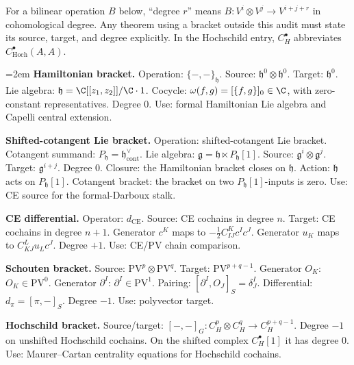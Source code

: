 \documentclass[11pt]{memoir}
\begin{document}
\noindent
For a bilinear operation \(B\) below, ``degree \(r\)''
means \(B\colon V^i\otimes V^j\to V^{i+j+r}\) in cohomological degree.
Any theorem using a bracket outside this audit must state its source,
target, and degree explicitly.  In the Hochschild entry,
\(C_H^\bullet\) abbreviates \(C^\bullet_{\mathrm{Hoch}}(A,A)\).
\begingroup
\footnotesize
\raggedright
\emergencystretch=2em
\noindent\textbf{Hamiltonian bracket.}
Operation: \(\{-,-\}_{\mathfrak h}\).  Source:
\(\mathfrak h^0\otimes\mathfrak h^0\).  Target: \(\mathfrak h^0\).
Lie algebra: \(\mathfrak h=\C[[z_1,z_2]]/\C\cdot1\).  Cocycle:
\(\omega(f,g)=[\{f,g\}]_0\in\C\), with zero-constant representatives.
Degree \(0\).  Use: formal Hamiltonian Lie algebra and Capelli central
extension.

\par\smallskip\noindent\textbf{Shifted-cotangent Lie bracket.}
Operation: shifted-cotangent Lie bracket.  Cotangent summand:
\(P_{\mathfrak h}=\mathfrak h^\vee_{\mathrm{cont}}\).  Lie algebra:
\(\mathfrak g=\mathfrak h\ltimes P_{\mathfrak h}[1]\).  Source:
\(\mathfrak g^i\otimes\mathfrak g^j\).  Target: \(\mathfrak g^{i+j}\).
Degree \(0\).  Closure: the Hamiltonian bracket closes on \(\mathfrak h\).
Action: \(\mathfrak h\) acts on \(P_{\mathfrak h}[1]\).  Cotangent bracket:
the bracket on two \(P_{\mathfrak h}[1]\)-inputs is zero.  Use: CE source
for the formal-Darboux stalk.

\par\smallskip\noindent\textbf{CE differential.}
Operator: \(d_{\mathrm{CE}}\).  Source: CE cochains in degree \(n\).
Target: CE cochains in degree \(n+1\).  Generator \(c^K\) maps to
\(-\tfrac12 C^K_{IJ}c^Ic^J\).  Generator \(u_K\) maps to
\(C^L_{KJ}u_Lc^J\).  Degree \(+1\).  Use: CE/PV chain comparison.

\par\smallskip\noindent\textbf{Schouten bracket.}
Source: \(\mathrm{PV}^p\otimes\mathrm{PV}^q\).  Target:
\(\mathrm{PV}^{p+q-1}\).  Generator \(O_K\):
\(O_K\in\mathrm{PV}^0\).  Generator \(\partial^I\):
\(\partial^I\in\mathrm{PV}^1\).  Pairing:
\([\partial^I,O_J]_S=\delta^I_J\).  Differential:
\(d_\pi=[\pi,-]_S\).  Degree \(-1\).  Use: polyvector target.

\par\smallskip\noindent\textbf{Hochschild bracket.}
Source/target:
\([-,-]_G\colon C_H^p\otimes C_H^q\to C_H^{p+q-1}\).  Degree \(-1\)
on unshifted Hochschild cochains.  On the shifted complex
\(C_H^\bullet[1]\) it has degree \(0\).  Use: Maurer--Cartan centrality
equations for Hochschild cochains.
\end{document}
